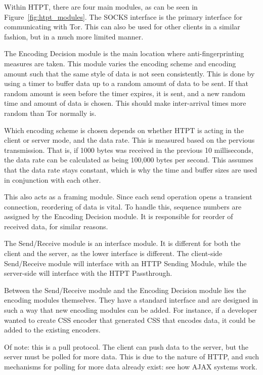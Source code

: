 Within HTPT, there are four main modules, as can be seen in Figure~\ref{fig:htpt_modules}. The SOCKS interface is the primary interface for communicating with Tor. This can also be used for other clients in a similar fashion, but in a much more limited manner.

The Encoding Decision module is the main location where anti-fingerprinting measures are taken. This module varies the encoding scheme and encoding amount such that the same style of data is not seen consistently. This is done by using a timer to buffer data up to a random amount of data to be sent. If that random amount is seen before the timer expires, it is sent, and a new random time and amount of data is chosen. This should make inter-arrival times more random than Tor normally is. 

Which encoding scheme is chosen depends on whether HTPT is acting in the client or server mode, and the data rate. This is measured based on the pervious transmission. That is, if 1000 bytes was received in the previous 10 milliseconds, the data rate can be calculated as being 100,000 bytes per second. This assumes that the data rate stays constant, which is why the time and buffer sizes are used in conjunction with each other.

This also acts as a framing module. Since each send operation opens a transient connection, reordering of data is vital. To handle this, sequence numbers are assigned by the Encoding Decision module. It is responsible for reorder of received data, for similar reasons. 

The Send/Receive module is an interface module. It is different for both the client and the server, as the lower interface is different. The client-side Send/Receive module will interface with an HTTP Sending Module, while the server-side will interface with the HTPT Passthrough.

Between the Send/Receive module and the Encoding Decision module lies the encoding modules themselves. They have a standard interface and are designed in such a way that new encoding modules can be added. For instance, if a developer wanted to create CSS encoder that generated CSS that encodes data, it could be added to the existing encoders.

Of note: this is a pull protocol. The client can push data to the server, but the server must be polled for more data. This is due to the nature of HTTP, and such mechanisms for polling for more data already exist: see how AJAX systems work.

